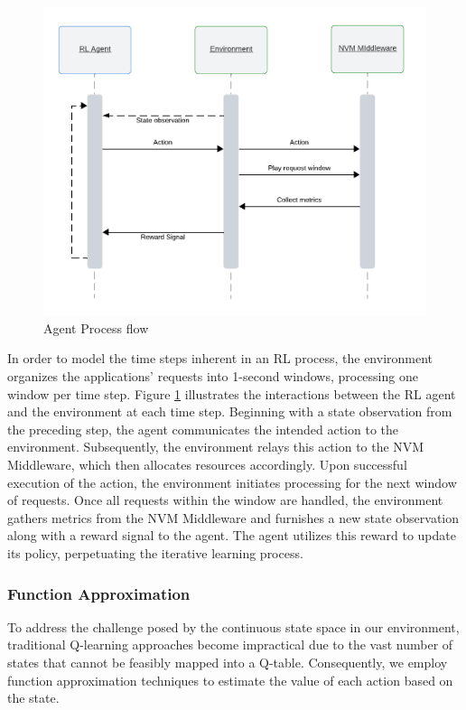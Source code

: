 \begin{figure}[ht]
  \centering
  \includegraphics[width=1\textwidth]{images/rl_sequence_flow.png}
  \caption{Agent Process flow}
  \label{fig:rl_sequence_flow}
\end{figure}

In order to model the time steps inherent in an RL process, the environment organizes the applications' requests into 1-second windows, processing one window per time step. Figure \ref{fig:rl_sequence_flow} illustrates the interactions between the RL agent and the environment at each time step. Beginning with a state observation from the preceding step, the agent communicates the intended action to the environment. Subsequently, the environment relays this action to the NVM Middleware, which then allocates resources accordingly. Upon successful execution of the action, the environment initiates processing for the next window of requests. Once all requests within the window are handled, the environment gathers metrics from the NVM Middleware and furnishes a new state observation along with a reward signal to the agent. The agent utilizes this reward to update its policy, perpetuating the iterative learning process.

\subsubsection{Function Approximation}

To address the challenge posed by the continuous state space in our environment, traditional Q-learning approaches become impractical due to the vast number of states that cannot be feasibly mapped into a Q-table. Consequently, we employ function approximation techniques to estimate the value of each action based on the state.

